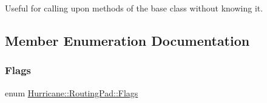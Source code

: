 Useful for calling upon methods of the base class without knowing it. 

\subsection{Member Enumeration Documentation}
\mbox{\label{classHurricane_1_1RoutingPad_a69f37f0b06b9bfd758d9be42c71e2bd4}} 
\subsubsection{\texorpdfstring{Flags}{Flags}}
{\footnotesize\ttfamily enum \hyperlink{classHurricane_1_1RoutingPad_a69f37f0b06b9bfd758d9be42c71e2bd4}{Hurricane\+::\+Routing\+Pad\+::\+Flags}}

